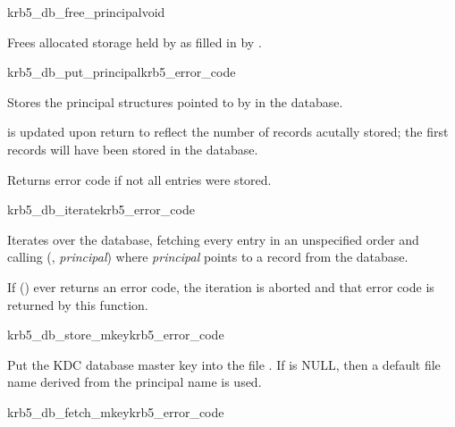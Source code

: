 \begin{funcdecl}{krb5_db_free_principal}{void}{\funcin}
\end{funcdecl}

Frees allocated storage held by  as filled in by
.


\begin{funcdecl}{krb5_db_put_principal}{krb5_error_code}{\funcin}
\end{funcdecl}

Stores the  principal structures pointed to by
 in the database.

 is updated upon return to reflect the number of records
acutally stored; the first  records will have been
stored in the database.

Returns error code if not all entries were stored.

\begin{funcdecl}{krb5_db_iterate}{krb5_error_code}{\funcin}
\funcendfuncarg
{}
\end{funcdecl}

Iterates over the database, fetching every entry in an unspecified order
and calling (,
{\sl principal\/}) where {\sl principal\/} points to a record from the
database.

If () ever returns an error code, the iteration is
aborted and that error code is returned by this function.

\begin{funcdecl}{krb5_db_store_mkey}{krb5_error_code}{\funcin}
\end{funcdecl}

Put the KDC database master key into the file . If
 is NULL, then a default file name derived from the
principal name  is used.

\begin{funcdecl}{krb5_db_fetch_mkey}{krb5_error_code}{\funcin}
\funcinout
{}
\end{funcdecl}

